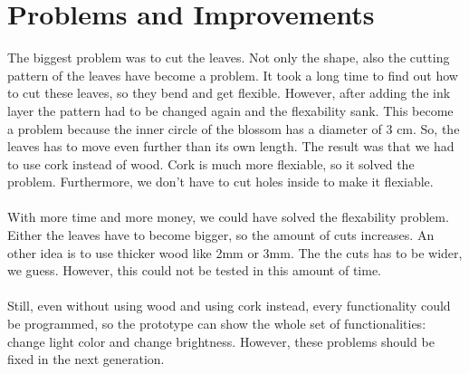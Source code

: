 \documentclass[00_doc.tex]{subfiles}
\begin{document}
    \section{Problems and Improvements}
    \begin{flushleft}
        The biggest problem was to cut the leaves. Not only the shape, also the cutting pattern 
        of the leaves have become a problem. It took a long time to find out how to cut these leaves,
        so they bend and get flexible. However, after adding the ink layer the pattern had to be changed
        again and the flexability sank. This become a problem because the inner circle of the blossom 
        has a diameter of 3 cm. So, the leaves has to move even further than its own length. 
        The result was that we had to use cork instead of wood. Cork is much more flexiable, so it 
        solved the problem. Furthermore, we don't have to cut holes inside to make it flexiable. \\~\\
        
        With more time and more money, we could have solved the flexability problem. Either the leaves 
        have to become bigger, so the amount of cuts increases. An other idea is to use thicker wood
        like 2mm or 3mm. The the cuts has to be wider, we guess. However, this could not be tested in 
        this amount of time.\\~\\
        
        Still, even without using wood and using cork instead, every functionality could be 
        programmed, so the prototype can show the whole set of functionalities: change light color 
        and change brightness. However, these problems should be fixed in the next generation.
    \end{flushleft}
\end{document}
